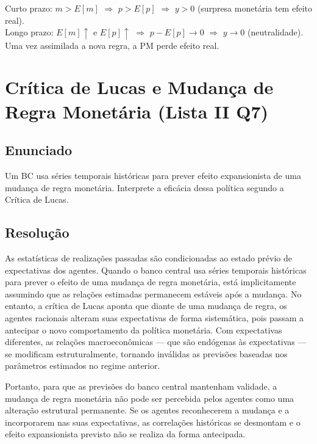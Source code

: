 \documentclass[12pt, a4paper]{article}
\begin{document}
\begin{resultbox}[title={Curva de Lucas: Curto e Longo Prazo (Lista II Q6)}]
Curto prazo: $m > E[m]$ $\Rightarrow$ $p > E[p]$ $\Rightarrow$ $y > 0$ (surpresa monetária tem efeito real).\\
Longo prazo: $E[m]\uparrow$ e $E[p]\uparrow$ $\Rightarrow$ $p - E[p] \to 0$ $\Rightarrow$ $y \to 0$ (neutralidade). Uma vez assimilada a nova regra, a PM perde efeito real.
\end{resultbox}

\section{Crítica de Lucas e Mudança de Regra Monetária (Lista II Q7)}

\subsection*{Enunciado}
Um BC usa séries temporais históricas para prever efeito expansionista de uma mudança de regra monetária. Interprete a eficácia dessa política segundo a Crítica de Lucas.

\subsection*{Resolução}

As estatísticas de realizações passadas são condicionadas ao estado prévio de expectativas dos agentes. Quando o banco central usa séries temporais históricas para prever o efeito de uma mudança de regra monetária, está implicitamente assumindo que as relações estimadas permanecem estáveis após a mudança. No entanto, a crítica de Lucas aponta que diante de uma mudança de regra, os agentes racionais alteram suas expectativas de forma sistemática, pois passam a antecipar o novo comportamento da política monetária. Com expectativas diferentes, as relações macroeconômicas --- que são endógenas às expectativas --- se modificam estruturalmente, tornando inválidas as previsões baseadas nos parâmetros estimados no regime anterior.

Portanto, para que as previsões do banco central mantenham validade, a mudança de regra monetária não pode ser percebida pelos agentes como uma alteração estrutural permanente. Se os agentes reconhecerem a mudança e a incorporarem nas suas expectativas, as correlações históricas se desmontam e o efeito expansionista previsto não se realiza da forma antecipada.
\end{document}
